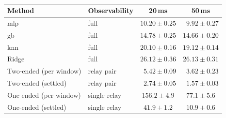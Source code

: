 \begin{table}[ht]
\caption{}
\label{tab:baselines_fl}
\small
\centering
\begin{revblock}
\begin{tabular}{llcc}
\toprule
\textbf{Method} & \textbf{Observability} & \textbf{20\,ms} & \textbf{50\,ms} \\
\midrule
\ac{mlp}        & full        & $10.20\pm0.25$ & $\phantom{0}9.92\pm0.27$ \\
\ac{gb}        & full        & $14.78\pm0.25$ & $14.66\pm0.20$ \\
\ac{knn}        & full        & $20.10\pm0.16$ & $19.12\pm0.14$ \\
Ridge        & full        & $26.12\pm0.36$ & $26.13\pm0.31$ \\
\midrule
Two-ended (per window) & relay pair   & $\phantom{0}5.42\pm0.09$ & $\phantom{0}3.62\pm0.23$ \\
Two-ended (settled)    & relay pair   & $\phantom{0}\mathbf{2.74\pm0.05}$ & $\phantom{0}\mathbf{1.57\pm0.03}$ \\
One-ended (per window) & single relay & $156.2\pm4.9$ & $77.1\pm5.6$ \\
One-ended (settled)    & single relay & $41.9\pm1.2$ & $10.9\pm0.6$ \\
\bottomrule
\end{tabular}
\end{revblock}
\end{table}
